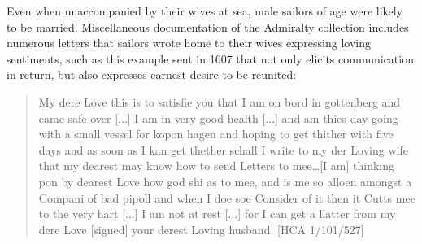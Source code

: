   Even when unaccompanied by their wives at sea, male sailors of age were likely to be married. Miscellaneous documentation of the Admiralty collection includes numerous letters that sailors wrote home to their wives expressing loving sentiments, such as this example sent in 1607 that not only elicits communication in return, but also expresses earnest desire to be reunited:

\begin{quotation}
My dere Love this is to satisfie you that I am on bord in gottenberg and came safe over [...] I am in very good health [...] and am thies day going with a small vessel for kopon hagen and hoping to get thither with five days and as soon as I kan get thether schall I write to my der Loving wife that my dearest may know how to send Letters to mee…[I am] thinking pon by dearest Love how god shi as to mee, and is me so alloen amongst a Compani of bad pipoll and when I doe soe Consider of it then it Cutts mee to the very hart [...] I am not at rest [...] for I can get a llatter from my dere Love [signed] your derest Loving husband. [HCA 1/101/527]\end{quotation}

